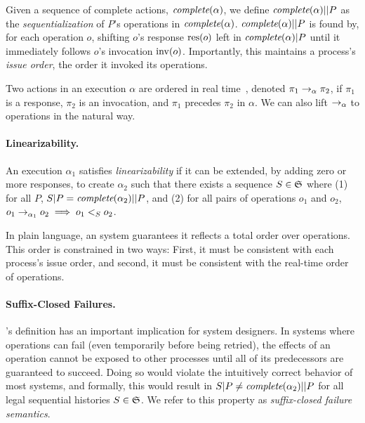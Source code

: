 Given a sequence of complete actions,
$\operatorname*{\textit{complete}}(\alpha)$, we define $\operatorname*{\textit{complete}}(\alpha)||P$ as the
\textit{sequentialization} of $P$'s operations in $\operatorname*{\textit{complete}}(\alpha)$.
$\operatorname*{\textit{complete}}(\alpha)||P$ is found by, for each operation $o$, shifting $o$'s response
$\operatorname{res}(o)$ left in $\operatorname*{\textit{complete}}(\alpha)|P$ until it immediately follows $o$'s
invocation $\operatorname{inv}(o)$.
Importantly, this maintains a process's
\textit{issue order}, the order it invoked its operations.

Two actions in an execution $\alpha$ are
ordered in real time~\cite{herlihy1990linearizability}, denoted
$\pi_1 \rightarrow_\alpha \pi_2$, if $\pi_1$ is a response, $\pi_2$ is an
invocation, and $\pi_1$ precedes $\pi_2$ in $\alpha$.
We can also lift $\rightarrow_\alpha$ to operations in the natural
way.

\paragraph{\Multidispatch{} Linearizability.} An execution $\alpha_1$ satisfies \textit{\multidispatch{} linearizability} if it
can be extended, by adding zero or more responses, to create $\alpha_2$ such that
there exists a sequence $S \in \mathfrak{S}$ where (1) for all $P$,
$S|P = \operatorname*{\textit{complete}}(\alpha_2)||P$, and (2) for all pairs of operations
$o_1$ and $o_2$, $o_1 \rightarrow_{\alpha_1} o_2 \implies o_1 <_S o_2$.

In plain language, an \MDL{} system guarantees it reflects a total order 
over operations. This order is constrained in two ways: First,
it must be consistent with each process's issue order, and second, 
it must be consistent with the real-time order of operations.

\paragraph{Suffix-Closed Failures.}
\label{sec:mdl:def:failures}

\MDL{}'s definition has an important implication for system designers.
In systems where operations can fail (even temporarily before being retried), the
effects of an operation cannot be exposed to other processes until all of its 
predecessors are guaranteed to succeed. Doing so would violate the intuitively
correct behavior of most systems, and formally, this would result in
$S|P \neq \operatorname*{\textit{complete}}(\alpha_2)||P$ for all legal sequential histories
$S \in \mathfrak{S}$.
We refer to this property as \textit{suffix-closed failure semantics}.




